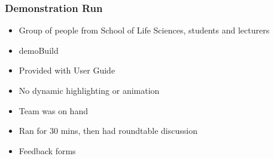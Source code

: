    
\begin{frame}
\frametitle{Demonstration Run}
\begin{itemize}
\item Group of people from School of Life Sciences, students and lecturers
\item demoBuild
\item Provided with User Guide
\item No dynamic highlighting or animation
\item Team was on hand
\item Ran for 30 mins, then had roundtable discussion
\item Feedback forms
\end{itemize}
\end{frame}    

